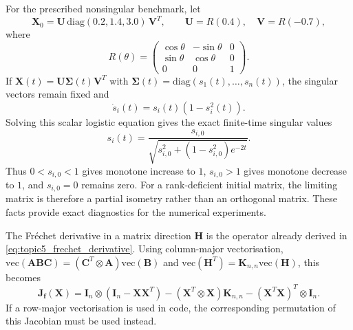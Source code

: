 \documentclass[11pt,a4paper]{article}
\theoremstyle{definition}
\theoremstyle{remark}
\begin{document}
For the prescribed nonsingular benchmark, let
\begin{equation}
\label{eq:topic5_benchmark}
\mathbf{X}_0=\mathbf{U}\,\mathrm{diag}(0.2,1.4,3.0)\,\mathbf{V}^T,
\qquad \mathbf{U}=R(0.4),\quad \mathbf{V}=R(-0.7),
\end{equation}
where
\begin{equation*}
R(\theta)=\begin{pmatrix}\cos\theta&-\sin\theta&0\\ \sin\theta&\cos\theta&0\\ 0&0&1\end{pmatrix}.
\end{equation*}
If
$\mathbf{X}(t)=\mathbf{U}\boldsymbol{\Sigma}(t)\mathbf{V}^T$ with
$\boldsymbol{\Sigma}(t)=\mathrm{diag}(s_1(t),\ldots,s_n(t))$, the singular vectors remain fixed and
\begin{equation}
\label{eq:singular_value_ode}
\dot{s}_i(t)=s_i(t)\left(1-s_i^2(t)\right).
\end{equation}
Solving this scalar logistic equation gives the exact finite-time singular values
\begin{equation}
\label{eq:singular_value_exact}
s_i(t)=\frac{s_{i,0}}{\sqrt{s_{i,0}^2+\left(1-s_{i,0}^2\right)e^{-2t}}}.
\end{equation}
Thus $0<s_{i,0}<1$ gives monotone increase to $1$, $s_{i,0}>1$ gives monotone decrease to $1$, and $s_{i,0}=0$ remains zero. For a rank-deficient initial matrix, the limiting matrix is therefore a partial isometry rather than an orthogonal matrix. These facts provide exact diagnostics for the numerical experiments.

The Fr\'echet derivative in a matrix direction $\mathbf{H}$ is the
operator already derived in \eqref{eq:topic5_frechet_derivative}.
Using column-major vectorisation, $\mathrm{vec}(\mathbf{A}\mathbf{B}\mathbf{C})=(\mathbf{C}^T\otimes\mathbf{A})\mathrm{vec}(\mathbf{B})$ and $\mathrm{vec}(\mathbf{H}^T)=\mathbf{K}_{n,n}\mathrm{vec}(\mathbf{H})$, this becomes
\begin{equation}
\label{eq:analytic_jacobian_kron}
\mathbf{J}_{\mathbf{f}}(\mathbf{X})
=\mathbf{I}_n\otimes\left(\mathbf{I}_n-\mathbf{X}\mathbf{X}^T\right)
-\left(\mathbf{X}^T\otimes\mathbf{X}\right)\mathbf{K}_{n,n}
-\left(\mathbf{X}^T\mathbf{X}\right)^T\otimes\mathbf{I}_n.
\end{equation}
If a row-major vectorisation is used in code, the corresponding permutation of this Jacobian must be used instead.
\end{document}
